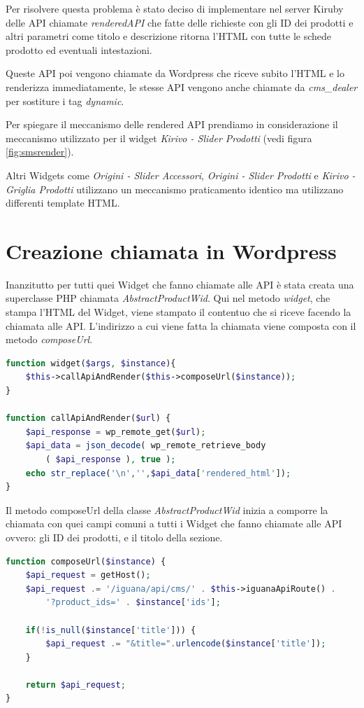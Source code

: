 Per risolvere questa problema è stato deciso di implementare nel server Kiruby delle API chiamate
\emph{renderedAPI} che fatte delle richieste con gli ID dei prodotti e altri parametri come titolo e descrizione
ritorna l'HTML con tutte le schede prodotto ed eventuali intestazioni.

Queste API poi vengono chiamate da Wordpress che riceve subito l'HTML e lo renderizza immediatamente,
le stesse API vengono anche chiamate da \emph{cms\_dealer} per sostiture i tag \emph{dynamic}.

Per spiegare il meccanismo delle rendered API prendiamo in considerazione il meccanismo utilizzato per il widget
\emph{Kirivo - Slider Prodotti} (vedi figura \ref{fig:smsrender}).

Altri Widgets come \emph{Origini - Slider Accessori}, \emph{Origini - Slider Prodotti} e \emph{Kirivo - Griglia Prodotti}
utilizzano un meccanismo praticamento identico ma utilizzano differenti template HTML.

\section{Creazione chiamata in Wordpress}
Inanzitutto per tutti quei Widget che fanno chiamate alle API è stata creata una superclasse PHP chiamata
\emph{AbstractProductWid}.
Qui nel metodo \emph{widget}, che stampa l'HTML del Widget, viene stampato il contentuo che si riceve facendo la chiamata alle
API. L'indirizzo a cui viene fatta la chiamata viene composta con il metodo \emph{composeUrl}.

\begin{lstlisting}[style=customphp, language=Php,caption={I metodi widget e \emph{callApiAndRender} di \emph{AbstractProductWid}}] 
function widget($args, $instance){
	$this->callApiAndRender($this->composeUrl($instance));
}

function callApiAndRender($url) {
	$api_response = wp_remote_get($url);
	$api_data = json_decode( wp_remote_retrieve_body
		( $api_response ), true );
	echo str_replace('\n','',$api_data['rendered_html']);
}
\end{lstlisting}

Il metodo composeUrl della classe \emph{AbstractProductWid} inizia a comporre la chiamata con quei campi
comuni a tutti i Widget che fanno chiamate alle API ovvero: gli ID dei prodotti, e il titolo della sezione.

\begin{lstlisting}[style=customphp, language=Php,caption={Il metodo \emph{composeUrl} di \emph{AbstractProductWid}}] 
function composeUrl($instance) {
    $api_request = getHost();
    $api_request .= '/iguana/api/cms/' . $this->iguanaApiRoute() . 
    	'?product_ids=' . $instance['ids'];

    if(!is_null($instance['title'])) {
        $api_request .= "&title=".urlencode($instance['title']);
    }

    return $api_request;
}

\end{lstlisting}

